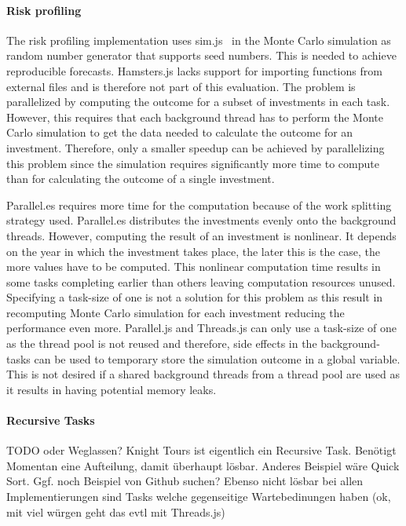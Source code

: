 \paragraph{Risk profiling}
The risk profiling implementation uses sim.js~\cite{simjs} in the Monte Carlo simulation as random number generator that supports seed numbers. This is needed to achieve reproducible forecasts. Hamsters.js lacks support for importing functions from external files and is therefore not part of this evaluation. The problem is parallelized by computing the outcome for a subset of investments in each task. However, this requires that each background thread has to perform the Monte Carlo simulation to get the data needed to calculate the outcome for an investment. Therefore, only a smaller speedup can be achieved by parallelizing this problem since the simulation requires significantly more time to compute than for calculating the outcome of a single investment. 

Parallel.es requires more time for the computation because of the work splitting strategy used. Parallel.es distributes the investments evenly onto the background threads. However, computing the result of an investment is nonlinear. It depends on the year in which the investment takes place, the later this is the case, the more values have to be computed. This nonlinear computation time results in some tasks completing earlier than others leaving computation resources unused. Specifying a task-size of one is not a solution for this problem as this result in recomputing Monte Carlo simulation for each investment reducing the performance even more. Parallel.js and Threads.js can only use a task-size of one as the thread pool is not reused and therefore, side effects in the background-tasks can be used to temporary store the simulation outcome in a global variable. This is not desired if a shared background threads from a thread pool are used as it results in having potential memory leaks.

\paragraph{Recursive Tasks}
TODO oder Weglassen? Knight Tours ist eigentlich ein Recursive Task. Benötigt Momentan eine Aufteilung, damit überhaupt lösbar. Anderes Beispiel wäre Quick Sort. Ggf. noch Beispiel von Github suchen? Ebenso nicht lösbar bei allen Implementierungen sind Tasks welche gegenseitige Wartebedinungen haben (ok, mit viel würgen geht das evtl mit Threads.js)
